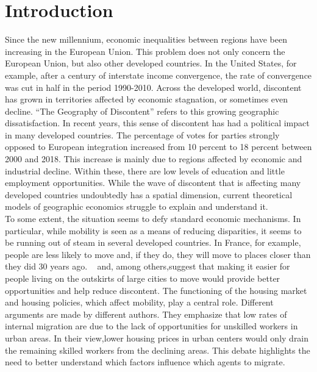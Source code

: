 \documentclass[12pt]{article}
\begin{document}
    \section{Introduction}\label{sec:introduction}
    Since the new millennium, economic inequalities between regions have been increasing in the European
    Union\citep{iammarino2019regional}.
    This problem does not only concern the European Union, but also other developed countries.
    In the United States, for example, after a century of interstate income convergence, the rate of convergence was
    cut in half in the period 1990-2010\citep{ganong2017has}.
    Across the developed world, discontent has grown in territories affected by economic stagnation, or sometimes
    even decline\citep{rodriguez2020institutions}.
    ``The Geography of Discontent'' refers to this growing geographic dissatisfaction\citep{dijkstra2020geography}.
    In recent years, this sense of discontent has had a political impact in many developed
    countries\citep{organisation2019oecd}.
    The percentage of votes for parties strongly opposed to European integration increased from 10 percent to 18
    percent between 2000 and 2018\citep{dijkstra2020geography}.
    This increase is mainly due to regions affected by economic and industrial decline.
    Within these, there are low levels of education and little employment opportunities\citep{becker2017voted}.
    While the wave of discontent that is affecting many developed countries undoubtedly has a spatial dimension,
    current theoretical models of geographic
    economics struggle to explain and understand it. \\

    To some extent, the situation seems to defy standard economic mechanisms.
    In particular, while mobility is seen as a means of reducing disparities, it seems to be running out of steam in
    several developed countries.
    In France, for example, people are less likely to move and, if they do, they will move to places closer than they
    did 30 years ago.
    ~\cite{hsieh2019housing} and\cite{ganong2017has}, among others,suggest that making it easier for people living on
    the outskirts of large cities to move would provide better opportunities and help reduce
    discontent.
    The functioning of the housing market and housing policies, which affect mobility, play a central role.
    Different arguments are made by different authors.
    They emphasize that low rates of internal migration are due to the lack of opportunities for unskilled workers in
    urban areas.
    In their view,lower housing prices in urban centers would only drain the remaining skilled workers from the
    declining areas.
    This debate highlights the need to better understand which factors influence which agents to migrate.
\end{document}
